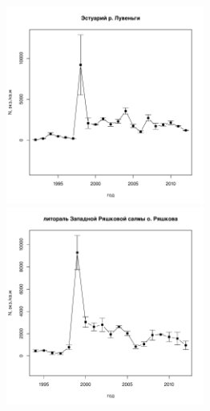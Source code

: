 \documentclass[12pt, a4paper]{disser}
\begin{document}
\begin{figure}[h]


	\begin{minipage}[b]{.46\linewidth}
	\begin{center}
	\includegraphics[width=65mm]{../White_Sea/Estuatiy_Luvenga/N_dynamic.pdf}
	\end{center}
	\end{minipage}
%
	\hfil %
%
	\begin{minipage}[b]{.46\linewidth}
	\begin{center}
		\includegraphics[width=65mm]{../White_Sea/Ryashkov_ZRS/N_dynamic.pdf}
	\end{center}
	\end{minipage}



\end{figure}
\end{document}
